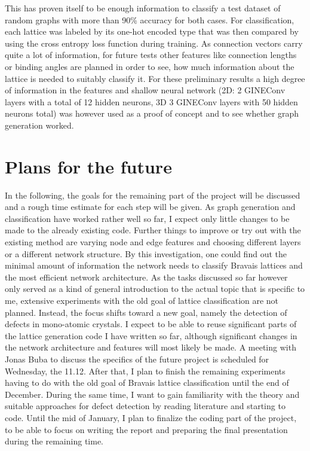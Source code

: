 \documentclass[11pt,a4paper]{article}
\begin{document}
This has proven itself to be enough information to classify a test dataset of random graphs with more than 90\% accuracy for both cases. 
For classification, each lattice was labeled by its one-hot encoded type that was then compared by using the cross entropy loss function during training. 
As connection vectors carry quite a lot of information, for future tests other features like connection lengths or binding angles are planned in order to see, how much information about the lattice is needed to suitably classify it. 
For these preliminary results a high degree of information in the features and shallow neural network (2D: 2 GINEConv layers \cite{pygteamGINEConv2024} with a total of 12 hidden neurons, 3D 3 GINEConv layers with 50 hidden neurons total) was however used as a proof of concept and to see whether graph generation worked. 



\section{Plans for the future}
\label{sec:Plans for the future}
In the following, the goals for the remaining part of the project will be discussed and a rough time estimate for each step will be given. 
As graph generation and classification have worked rather well so far, I expect only little changes to be made to the already existing code. 
Further things to improve or try out with the existing method are varying node and edge features and choosing different layers or a different network structure. 
By this investigation, one could find out the minimal amount of information the network needs to classify Bravais lattices and the most efficient network architecture. 
As the tasks discussed so far however only served as a kind of general introduction to the actual topic that is specific to me, extensive experiments with the old goal of lattice classification are not planned. 
Instead, the focus shifts toward a new goal, namely the detection of defects in mono-atomic crystals. 
I expect to be able to reuse significant parts of the lattice generation code I have written so far, although significant changes in the network architecture and features will most likely be made. 
A meeting with Jonas Buba to discuss the specifics of the future project is scheduled for Wednesday, the 11.12. 
After that, I plan to finish the remaining experiments having to do with the old goal of Bravais lattice classification until the end of December. 
During the same time, I want to gain familiarity with the theory and suitable approaches for defect detection by reading literature and starting to code. 
Until the mid of January, I plan to finalize the coding part of the project, to be able to focus on writing the report and preparing the final presentation during the remaining time. 
\end{document}
